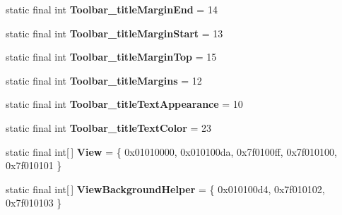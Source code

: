 \begin{DoxyCompactItemize}
\item 
\hypertarget{classandroid_1_1support_1_1design_1_1_r_1_1styleable_a33489940e504cd17320b0791518b1800}{}static final int {\bfseries Toolbar\+\_\+title\+Margin\+End} = 14\label{classandroid_1_1support_1_1design_1_1_r_1_1styleable_a33489940e504cd17320b0791518b1800}

\item 
\hypertarget{classandroid_1_1support_1_1design_1_1_r_1_1styleable_aaa2847451f4babb9f8453a3ab3f1437b}{}static final int {\bfseries Toolbar\+\_\+title\+Margin\+Start} = 13\label{classandroid_1_1support_1_1design_1_1_r_1_1styleable_aaa2847451f4babb9f8453a3ab3f1437b}

\item 
\hypertarget{classandroid_1_1support_1_1design_1_1_r_1_1styleable_ab372cb599a5074e8cc57f44c95430812}{}static final int {\bfseries Toolbar\+\_\+title\+Margin\+Top} = 15\label{classandroid_1_1support_1_1design_1_1_r_1_1styleable_ab372cb599a5074e8cc57f44c95430812}

\item 
\hypertarget{classandroid_1_1support_1_1design_1_1_r_1_1styleable_a7a7c87d2d30eb1c42aba4dc93e811b9f}{}static final int {\bfseries Toolbar\+\_\+title\+Margins} = 12\label{classandroid_1_1support_1_1design_1_1_r_1_1styleable_a7a7c87d2d30eb1c42aba4dc93e811b9f}

\item 
\hypertarget{classandroid_1_1support_1_1design_1_1_r_1_1styleable_a2cbcc72025cb5da4d094b8250deacd64}{}static final int {\bfseries Toolbar\+\_\+title\+Text\+Appearance} = 10\label{classandroid_1_1support_1_1design_1_1_r_1_1styleable_a2cbcc72025cb5da4d094b8250deacd64}

\item 
\hypertarget{classandroid_1_1support_1_1design_1_1_r_1_1styleable_a6cc4632e269ce480a68bcce27c2815d5}{}static final int {\bfseries Toolbar\+\_\+title\+Text\+Color} = 23\label{classandroid_1_1support_1_1design_1_1_r_1_1styleable_a6cc4632e269ce480a68bcce27c2815d5}

\item 
\hypertarget{classandroid_1_1support_1_1design_1_1_r_1_1styleable_ae848bcf5b638b9248537d28ebf90c67f}{}static final int\mbox{[}$\,$\mbox{]} {\bfseries View} = \{ 0x01010000, 0x010100da, 0x7f0100ff, 0x7f010100, 0x7f010101 \}\label{classandroid_1_1support_1_1design_1_1_r_1_1styleable_ae848bcf5b638b9248537d28ebf90c67f}

\item 
\hypertarget{classandroid_1_1support_1_1design_1_1_r_1_1styleable_a7df8d9542168fb1f80021c7e5b776ddb}{}static final int\mbox{[}$\,$\mbox{]} {\bfseries View\+Background\+Helper} = \{ 0x010100d4, 0x7f010102, 0x7f010103 \}\label{classandroid_1_1support_1_1design_1_1_r_1_1styleable_a7df8d9542168fb1f80021c7e5b776ddb}


\end{DoxyCompactItemize}
